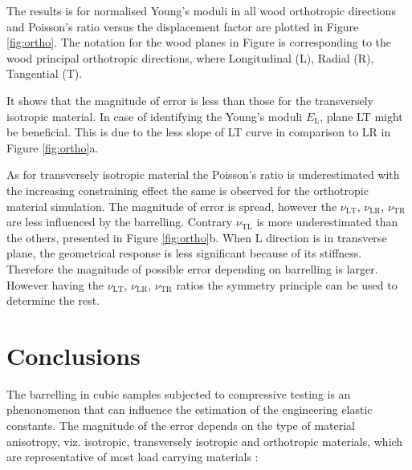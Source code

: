\documentclass[3p]{elsarticle}
\begin{document}
The results is for normalised Young's moduli in all wood orthotropic directions
and Poisson's ratio versus the displacement factor are plotted in Figure
\ref{fig:ortho}. The notation for the wood planes in Figure is corresponding to
the wood principal orthotropic directions, where Longitudinal (L), Radial (R),
Tangential (T). \par It shows that the magnitude of error is less than those for
the transversely isotropic material.
In case of identifying the Young's moduli $E_{\mathrm{L}}$, plane  LT might be
beneficial. This is due to the less slope of LT curve in comparison to LR in
Figure \ref{fig:ortho}a. \par
As for transversely isotropic material the Poisson's ratio is underestimated
with the increasing constraining effect the same is observed for the orthotropic
material simulation. The magnitude of error is spread, however the
$\nu_{\mathrm{LT}}$, $\nu_{\mathrm{LR}}$, $\nu_{\mathrm{TR}}$ are less
influenced by the barrelling. Contrary $\nu_{\mathrm{TL}}$ is more
underestimated than the others, presented in Figure \ref{fig:ortho}b. When L
direction is in transverse plane, the geometrical response is less significant
because of its stiffness. Therefore the magnitude of possible error depending on
barrelling is larger. However having the $\nu_{\mathrm{LT}}$,
$\nu_{\mathrm{LR}}$, $\nu_{\mathrm{TR}}$ ratios the symmetry principle can
be used to determine the rest.










\section{Conclusions}

The barrelling in cubic samples subjected to compressive testing is an phenonomenon that can influence the
estimation of the engineering elastic constants. The magnitude of the error depends on the type of material anisotropy, viz. 
isotropic, transversely isotropic and orthotropic materials, which are representative of most load carrying materials :
\end{document}
